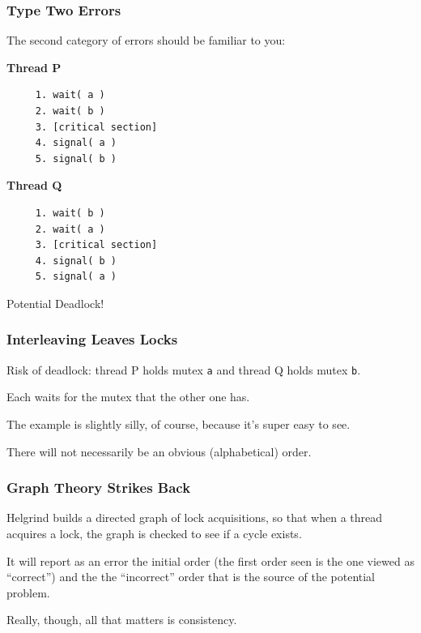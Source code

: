 \begin{frame}[fragile]
\frametitle{Type Two Errors}

The second category of errors should be familiar to you:

\begin{multicols}{2}
\textbf{Thread P}
  \begin{verbatim}
	 1. wait( a ) 
	 2. wait( b )
	 3. [critical section]
	 4. signal( a )
	 5. signal( b )
  \end{verbatim}
\columnbreak
\textbf{Thread Q}
  \begin{verbatim}
	 1. wait( b ) 
	 2. wait( a )
	 3. [critical section]
	 4. signal( b )
	 5. signal( a )
  \end{verbatim}
\end{multicols}
\vspace{-2em}

Potential Deadlock!

\end{frame}

\begin{frame}
\frametitle{Interleaving Leaves Locks}

Risk of deadlock: thread P holds mutex \texttt{a} and thread Q holds mutex \texttt{b}. 

Each waits for the mutex that the other one has. 

The example is slightly silly, of course, because it's super easy to see. 

There will not necessarily be an obvious (alphabetical) order.

\end{frame}

\begin{frame}
\frametitle{Graph Theory Strikes Back}


Helgrind builds a directed graph of lock acquisitions, so that when a thread acquires a lock, the graph is checked to see if a cycle exists. 

  It will report as an error the initial order (the first order seen is the one viewed as ``correct'') and the the ``incorrect'' order that is the source of the potential problem. 
  
  Really, though, all that matters is consistency.

\end{frame}


